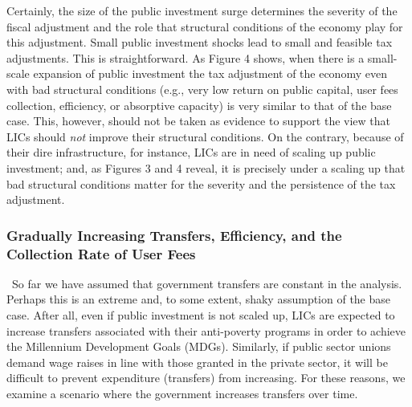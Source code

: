 \documentclass[11pt]{article}
\begin{document}
Certainly, the size of the public investment surge determines the severity
of the fiscal adjustment and the role that structural conditions of the
economy play for this adjustment. Small public investment shocks lead to
small and feasible tax adjustments. This is straightforward. As Figure 4
shows, when there is a small-scale expansion of public investment the tax
adjustment of the economy even with bad structural conditions (e.g., very
low return on public capital, user fees collection, efficiency, or
absorptive capacity) is very similar to that of the base case. This,
however, should not be taken as evidence to support the view that LICs
should \textit{not }improve their structural conditions. On the contrary,
because of their dire infrastructure, for instance, LICs are in need of
scaling up public investment; and, as Figures 3 and 4 reveal, it is
precisely under a scaling up that bad structural conditions matter for the
severity and the persistence of the tax adjustment.


\subsubsection{Gradually Increasing Transfers, Efficiency, and the
Collection Rate of User Fees}

\quad\ \thinspace So far we have assumed that government transfers are
constant in the analysis. Perhaps this is an extreme and, to some extent,
shaky assumption of the base case. After all, even if public investment is
not scaled up, LICs are expected to increase transfers associated with their
anti-poverty programs in order to achieve the Millennium Development Goals
(MDGs). Similarly, if public sector unions demand wage raises in line with
those granted in the private sector, it will be difficult to prevent
expenditure (transfers) from increasing. For these reasons, we examine a
scenario where the government increases transfers over time.
\end{document}
